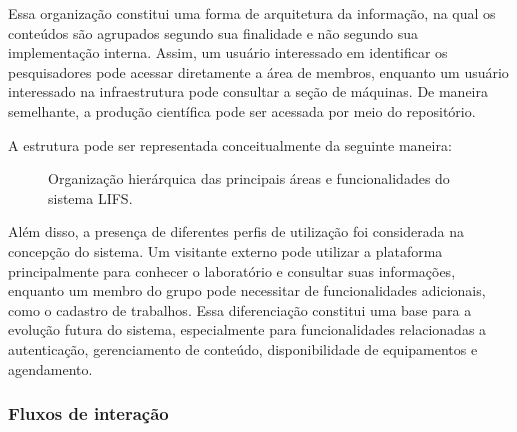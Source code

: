 Essa organização constitui uma forma de arquitetura da informação, na qual
os conteúdos são agrupados segundo sua finalidade e não segundo sua
implementação interna. Assim, um usuário interessado em identificar os
pesquisadores pode acessar diretamente a área de membros, enquanto um
usuário interessado na infraestrutura pode consultar a seção de máquinas.
De maneira semelhante, a produção científica pode ser acessada por meio do
repositório.

A estrutura pode ser representada conceitualmente da seguinte maneira:

\begin{figure}[H]
	\centering
	\caption{Organização hierárquica das principais áreas e funcionalidades do sistema LIFS.}
	\label{fig:arquitetura-lifs}
\end{figure}

Além disso, a presença de diferentes perfis de utilização foi considerada
na concepção do sistema. Um visitante externo pode utilizar a plataforma
principalmente para conhecer o laboratório e consultar suas informações,
enquanto um membro do grupo pode necessitar de funcionalidades adicionais,
como o cadastro de trabalhos. Essa diferenciação constitui uma base para a
evolução futura do sistema, especialmente para funcionalidades relacionadas
a autenticação, gerenciamento de conteúdo, disponibilidade de equipamentos e
agendamento.

\subsubsection{Fluxos de interação}

